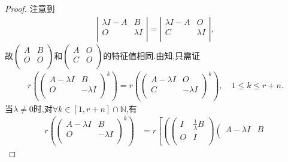 \documentclass[../../main.tex]{subfiles}%
\begin{document}
\begin{proof}

注意到
\begin{align*}
\left| \begin{matrix}
\lambda I-A&	B\\
O&	\lambda I\\
\end{matrix} \right|=\left| \begin{matrix}
\lambda I-A&	O\\
C&	\lambda I\\
\end{matrix} \right|,
\end{align*}
故$\left( \begin{matrix}
A&	B\\
O&	O\\
\end{matrix} \right)$和$\left( \begin{matrix}
A&	O\\
C&	O\\
\end{matrix} \right)$的特征值相同.由知,只需证
\begin{align*}
r\left( \left( \begin{matrix}
A-\lambda I&	B\\
O&	-\lambda I\\
\end{matrix} \right) ^k \right) =r\left( \left( \begin{matrix}
A-\lambda I&	O\\
C&	-\lambda I\\
\end{matrix} \right) ^k \right) ,\quad 1\leqslant k\leqslant r+n.
\end{align*}
当$\lambda \ne 0$时,对$\forall k\in \left[ 1,r+n \right] \cap \mathbb{N}$,有
\begin{align*}
r\left( \left( \begin{matrix}
A-\lambda I&	B\\
O&	-\lambda I\\
\end{matrix} \right) ^k \right) &=r\left[ \left( \left( \begin{matrix}
I&	\frac{1}{\lambda}B\\
O&	I\\
\end{matrix} \right) \left( \begin{matrix}
A-\lambda I&	B\\

\end{matrix}
\end{align*}
\end{proof}
\end{document}

